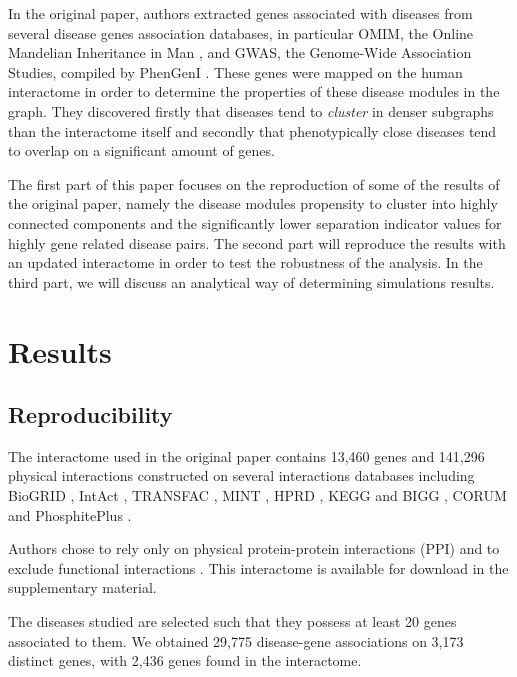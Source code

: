 \documentclass[letterpaper]{article}
\begin{document}
In the original paper, authors extracted genes associated with diseases from several disease genes
association databases, in particular OMIM, the Online Mandelian Inheritance in Man \citep{amberger2008OMIM},
and GWAS, the Genome-Wide Association Studies, compiled by PhenGenI \citep{ramos2014PhenGenI}. These
genes were mapped on the human interactome in order to determine the properties of these disease modules
in the graph. They discovered firstly that diseases tend to \textit{cluster} in denser subgraphs than
the interactome itself and secondly that phenotypically close diseases tend to overlap on a significant
amount of genes.

The first part of this paper focuses on the reproduction of some of the results of the original paper,
namely the disease modules propensity to cluster into highly connected components and the significantly
lower separation indicator values for highly gene related disease pairs. The second part will reproduce
the results with an updated interactome in order to test the robustness of the analysis. In the third
part, we will discuss an analytical way of determining simulations results.

\section{Results}
	\subsection{Reproducibility}\label{subsec:reproducibility}
	The interactome used in the original paper contains 13,460 genes and 141,296 physical interactions
	constructed on several interactions databases including BioGRID \citep{chatr2017biogrid}, IntAct
	\citep{kerrien2011intact}, TRANSFAC \citep{matys2003transfac}, MINT \citep{licata2011mint}, HPRD
	\citep{keshava2008HPRD}, KEGG and BIGG \citep{lee2008KEGG-BIGG}, CORUM \citep{ruepp2009corum} and
	PhosphitePlus \citep{hornbeck2011phosphositeplus}.

	Authors chose to rely only on physical protein-protein interactions (PPI) and to exclude functional
	interactions \citep{caldera2017interactome}. This interactome is available for download in the
	supplementary material.

	The diseases studied are selected such that they possess at least 20 genes associated to them.
	We obtained 29,775 disease-gene associations on 3,173 distinct genes, with 2,436 genes found in the
	interactome.
\end{document}
